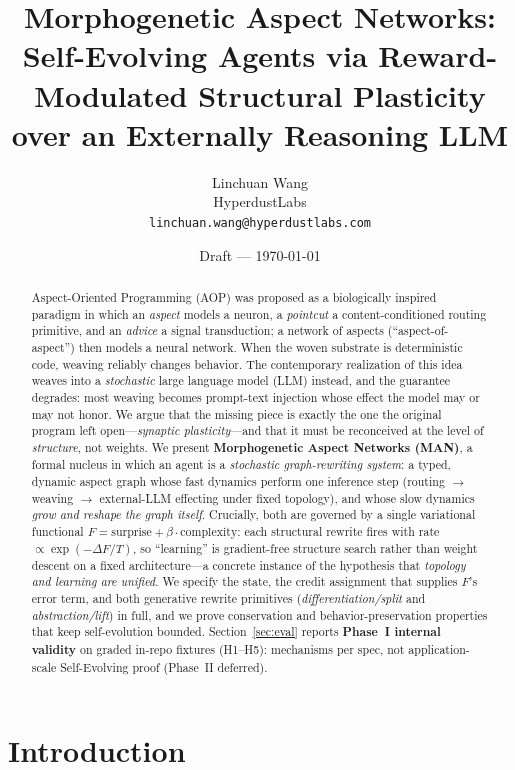 \documentclass[11pt]{article}
\title{\textbf{Morphogenetic Aspect Networks:}\\[2pt]
Self-Evolving Agents via Reward-Modulated Structural Plasticity\\
over an Externally Reasoning LLM}
\author{Linchuan Wang\\
\small HyperdustLabs\\
\small \texttt{linchuan.wang@hyperdustlabs.com}}
\date{Draft --- \today}
\theoremstyle{definition}
\begin{document}
\maketitle

\begin{abstract}
Aspect-Oriented Programming (AOP) was proposed as a biologically inspired
paradigm in which an \emph{aspect} models a neuron, a \emph{pointcut} a
content-conditioned routing primitive, and an \emph{advice} a signal
transduction; a network of aspects (``aspect-of-aspect'') then models a
neural network. When the woven substrate is deterministic code, weaving
reliably changes behavior. The contemporary realization of this idea
weaves into a \emph{stochastic} large language model (LLM) instead, and the
guarantee degrades: most weaving becomes prompt-text injection whose effect
the model may or may not honor. We argue that the missing piece is exactly
the one the original program left open---\emph{synaptic plasticity}---and
that it must be reconceived at the level of \emph{structure}, not weights.
We present \textbf{Morphogenetic Aspect Networks (MAN)}, a formal nucleus in
which an agent is a \emph{stochastic graph-rewriting system}: a typed,
dynamic aspect graph whose fast dynamics perform one inference step
(routing $\to$ weaving $\to$ external-LLM effecting under fixed topology),
and whose slow dynamics \emph{grow and reshape the graph itself}. Crucially,
both are governed by a single variational functional $F=\text{surprise}+\beta\cdot\text{complexity}$:
each structural rewrite fires with rate $\propto\exp(-\Delta F/T)$, so
``learning'' is gradient-free structure search rather than weight descent on
a fixed architecture---a concrete instance of the hypothesis that
\emph{topology and learning are unified}. We specify the state, the credit
assignment that supplies $F$'s error term, and both generative rewrite
primitives (\emph{differentiation/split} and \emph{abstraction/lift}) in full,
and we prove conservation
and behavior-preservation properties that keep self-evolution bounded.
Section~\ref{sec:eval} reports \textbf{Phase~I internal validity} on graded
in-repo fixtures (H1--H5): mechanisms per spec, not application-scale
Self-Evolving proof (Phase~II deferred).
\end{abstract}

\section{Introduction}
\end{document}
